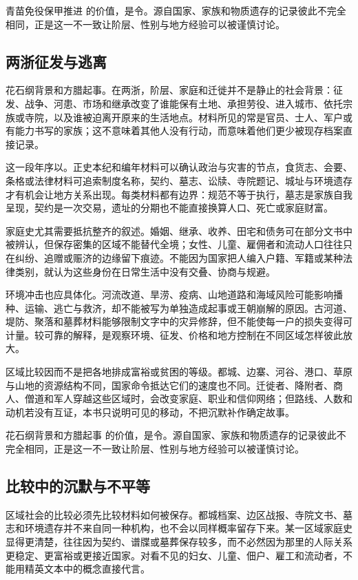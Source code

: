 青苗免役保甲推进 的价值，是令。源自国家、家族和物质遗存的记录彼此不完全相同，正是这一不一致让阶层、性别与地方经验可以被谨慎讨论。

\subsection{两浙征发与逃离}

花石纲背景和方腊起事。在两浙，阶层、家庭和迁徙并不是静止的社会背景：征发、战争、河患、市场和继承改变了谁能保有土地、承担劳役、进入城市、依托宗族或寺院，以及谁被迫离开原来的生活地点。材料所见的常是官员、士人、军户或有能力书写的家族；这不意味着其他人没有行动，而意味着他们更少被现存档案直接记录。

这一段年序以。正史本纪和编年材料可以确认政治与灾害的节点，食货志、会要、条格或法律材料可追索制度名称，契约、墓志、讼牍、寺院题记、城址与环境遗存才有机会让地方关系出现。每类材料都有边界：规范不等于执行，墓志是家族自我呈现，契约是一次交易，遗址的分期也不能直接换算人口、死亡或家庭财富。

家庭史尤其需要抵抗整齐的叙述。婚姻、继承、收养、田宅和债务可在部分文书中被辨认，但保存密集的区域不能替代全境；女性、儿童、雇佣者和流动人口往往只在纠纷、追赠或赈济的边缘留下痕迹。不能因为国家把人编入户籍、军籍或某种法律类别，就认为这些身份在日常生活中没有交叠、协商与规避。

环境冲击也应具体化。河流改道、旱涝、疫病、山地道路和海域风险可能影响播种、运输、逃亡与救济，却不能被写为单独造成起事或王朝崩解的原因。古河道、堤防、聚落和墓葬材料能够限制文字中的灾异修辞，但不能使每一户的损失变得可计量。较可靠的解释，是观察环境、征发、价格和地方控制在不同区域怎样彼此放大。

区域比较因而不是把各地排成富裕或贫困的等级。都城、边寨、河谷、港口、草原与山地的资源结构不同，国家命令抵达它们的速度也不同。迁徙者、降附者、商人、僧道和军人穿越这些区域时，会改变家庭、职业和信仰网络；但路线、人数和动机若没有互证，本书只说明可见的移动，不把沉默补作确定故事。

花石纲背景和方腊起事 的价值，是令。源自国家、家族和物质遗存的记录彼此不完全相同，正是这一不一致让阶层、性别与地方经验可以被谨慎讨论。

\subsection{比较中的沉默与不平等}

区域社会的比较必须先比较材料如何被保存。都城档案、边区战报、寺院文书、墓志和环境遗存并不来自同一种机构，也不会以同样概率留存下来。某一区域家庭史显得更清楚，往往因为契约、谱牒或墓葬保存较多，而不必然因为那里的人际关系更稳定、更富裕或更接近国家。对看不见的妇女、儿童、佃户、雇工和流动者，不能用精英文本中的概念直接代言。

